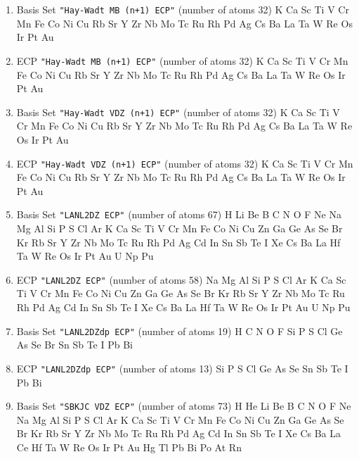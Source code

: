 \begin{enumerate}

\item Basis Set \verb#"Hay-Wadt MB (n+1) ECP"# (number of atoms 32)  \newline
  K Ca Sc Ti V Cr Mn Fe Co Ni Cu Rb Sr Y Zr Nb Mo Tc Ru Rh Pd Ag Cs Ba La
 Ta W Re Os Ir Pt Au


\item ECP \verb#"Hay-Wadt MB (n+1) ECP"# (number of atoms 32)  \newline
  K Ca Sc Ti V Cr Mn Fe Co Ni Cu Rb Sr Y Zr Nb Mo Tc Ru Rh Pd Ag Cs Ba La
 Ta W Re Os Ir Pt Au


\item Basis Set \verb#"Hay-Wadt VDZ (n+1) ECP"# (number of atoms 32)  \newline
  K Ca Sc Ti V Cr Mn Fe Co Ni Cu Rb Sr Y Zr Nb Mo Tc Ru Rh Pd Ag Cs Ba La
 Ta W Re Os Ir Pt Au


\item ECP \verb#"Hay-Wadt VDZ (n+1) ECP"# (number of atoms 32)  \newline
  K Ca Sc Ti V Cr Mn Fe Co Ni Cu Rb Sr Y Zr Nb Mo Tc Ru Rh Pd Ag Cs Ba La
 Ta W Re Os Ir Pt Au


\item Basis Set \verb#"LANL2DZ ECP"# (number of atoms 67)  \newline
  H Li Be B C N O F Ne Na Mg Al Si P S Cl Ar K Ca Sc Ti V Cr Mn Fe
 Co Ni Cu Zn Ga Ge As Se Br Kr Rb Sr Y Zr Nb Mo Tc Ru Rh Pd Ag Cd In Sn Sb
 Te I Xe Cs Ba La Hf Ta W Re Os Ir Pt Au U Np Pu


\item ECP \verb#"LANL2DZ ECP"# (number of atoms 58)  \newline
  Na Mg Al Si P S Cl Ar K Ca Sc Ti V Cr Mn Fe Co Ni Cu Zn Ga Ge As Se Br
 Kr Rb Sr Y Zr Nb Mo Tc Ru Rh Pd Ag Cd In Sn Sb Te I Xe Cs Ba La Hf Ta W
 Re Os Ir Pt Au U Np Pu


\item Basis Set \verb#"LANL2DZdp ECP"# (number of atoms 19)  \newline
  H C N O F Si P S Cl Ge As Se Br Sn Sb Te I Pb Bi


\item ECP \verb#"LANL2DZdp ECP"# (number of atoms 13)  \newline
  Si P S Cl Ge As Se Sn Sb Te I Pb Bi

\item Basis Set \verb#"SBKJC VDZ ECP"# (number of atoms 73)  \newline
  H He Li Be B C N O F Ne Na Mg Al Si P S Cl Ar K Ca Sc Ti V Cr Mn
 Fe Co Ni Cu Zn Ga Ge As Se Br Kr Rb Sr Y Zr Nb Mo Tc Ru Rh Pd Ag Cd In Sn
 Sb Te I Xe Cs Ba La Ce Hf Ta W Re Os Ir Pt Au Hg Tl Pb Bi Po At Rn



\end{enumerate}
